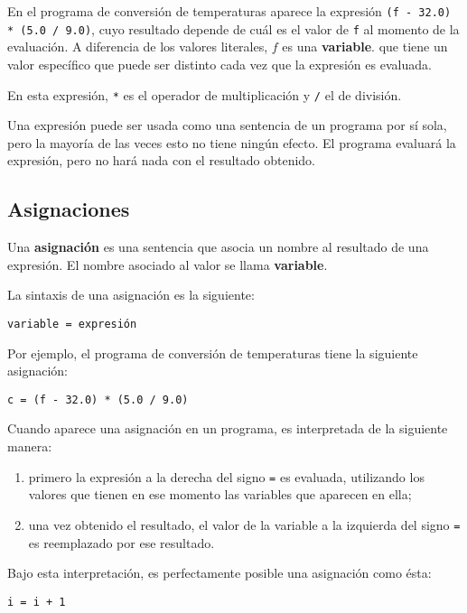 En el programa de conversión de temperaturas aparece la expresión
\lstinline!(f - 32.0) * (5.0 / 9.0)!, cuyo resultado depende de cuál es
el valor de \lstinline!f! al momento de la evaluación. A diferencia de
los valores literales, \(f\) es una \textbf{variable}. que tiene un valor
específico que puede ser distinto cada vez que la expresión es evaluada.

En esta expresión, \lstinline!*! es el operador de multiplicación y
\lstinline!/! el de división.

Una expresión puede ser usada como una sentencia de un programa por sí
sola, pero la mayoría de las veces esto no tiene ningún efecto. El
programa evaluará la expresión, pero no hará nada con el resultado
obtenido.

\subsection{Asignaciones}

Una \textbf{asignación} es una sentencia que asocia un nombre al
resultado de una expresión. El nombre asociado al valor se llama
\textbf{variable}.

La sintaxis de una asignación es la siguiente:

\begin{lstlisting}
variable = expresión
\end{lstlisting}

Por ejemplo, el programa de conversión de temperaturas tiene la
siguiente asignación:

\begin{lstlisting}
c = (f - 32.0) * (5.0 / 9.0)
\end{lstlisting}

Cuando aparece una asignación en un programa, es interpretada de la
siguiente manera:

\begin{enumerate}
\item
  primero la expresión a la derecha del signo \lstinline!=! es evaluada,
  utilizando los valores que tienen en ese momento las variables que
  aparecen en ella;
\item
  una vez obtenido el resultado, el valor de la variable a la izquierda
  del signo \lstinline!=! es reemplazado por ese resultado.
\end{enumerate}

Bajo esta interpretación, es perfectamente posible una asignación como
ésta:

\begin{lstlisting}
i = i + 1
\end{lstlisting}

